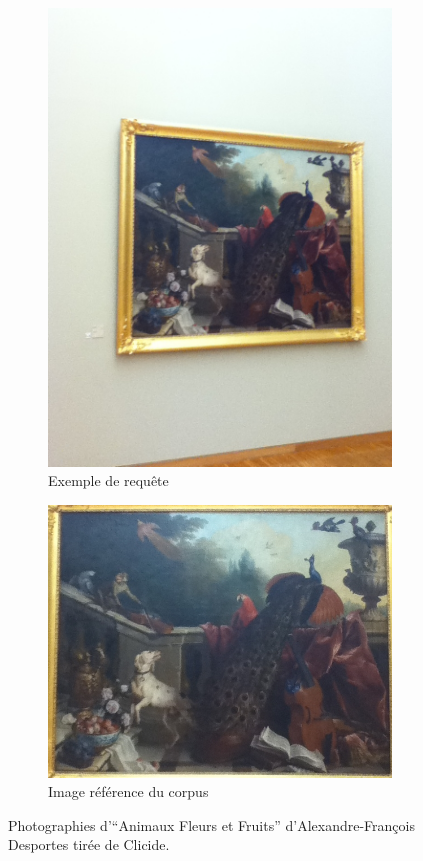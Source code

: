 \begin{figure}[htb]
\centering
\begin{subfigure}{0.4\linewidth}
	\includegraphics[height=0.95\textwidth,angle=-90]{figures/12G-0428.JPG}
	\caption{Exemple de requête}
\end{subfigure}


\begin{subfigure}{0.4\linewidth}
	\includegraphics[height=0.95\textwidth]{figures/12G-12.JPG}
	\caption{Image référence du corpus}
\end{subfigure}

    \caption{Photographies d'``Animaux Fleurs et Fruits'' d'Alexandre-François Desportes tirée de Clicide.}
 \label{fig:exempleRequeteClicide}
\end{figure}



